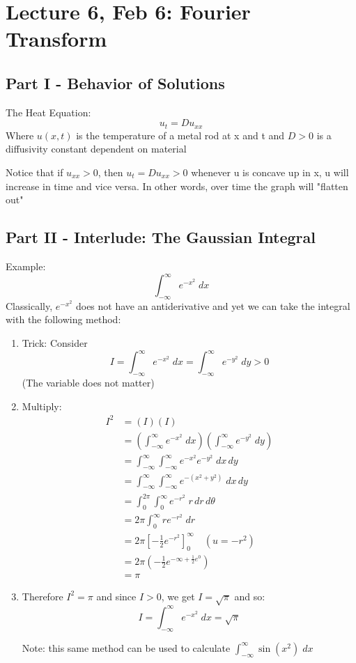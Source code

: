 \documentclass[12pt]{article}
\begin{document}
\section{Lecture 6, Feb 6: Fourier Transform}
\subsection*{Part I - Behavior of Solutions}
The Heat Equation:
\[u_t = Du_{xx}\]
Where $u(x, t)$ is the temperature of a metal rod at x and t and $D > 0$ is a diffusivity constant dependent on material

Notice that if $u_{xx} > 0$, then $u_t = Du_{xx} > 0$ whenever u is concave up in x, u will increase in time and vice versa. In other words, over time the graph will "flatten out"

\subsection*{Part II - Interlude: The Gaussian Integral}
Example: \[\int_{-\infty}^\infty e^{-x^2}\; dx\]
Classically, $e^{-x^2}$ does not have an antiderivative and yet we can take the integral with the following method:
\begin{enumerate}
    \item Trick: Consider 
    \[I = \int_{-\infty}^\infty e^{-x^2} \; dx = \int_{-\infty}^\infty e^{-y^2} \; dy > 0 \]
    (The variable does not matter)
    \item Multiply:
    \begin{align*}
        I^2 &= (I)(I)\\
        &= \left(\int_{-\infty}^\infty e^{-x^2} \; dx\right)\left(\int_{-\infty}^\infty e^{-y^2} \; dy\right)\\
        &= \int_{-\infty}^\infty \int_{-\infty}^\infty e^{-x^2} e^{-y^2} \; dx\, dy\\
        &= \int_{-\infty}^\infty \int_{-\infty}^\infty e^{-(x^2 +y^2)} \; dx\, dy\\
        &= \int_0^{2\pi} \int_0^\infty e^{-r^2} \; r\, dr\, d\theta\\
        &= 2\pi \int_0^\infty re^{-r^2} \; dr\\
        &= 2\pi \left[-\frac{1}{2}e^{-r^2}\right]_0^\infty \quad (u = -r^2)\\
        &= 2\pi \left(-\frac{1}{2}e^{-\infty + \frac{1}{2}e^0}\right)\\
        &= \pi        
    \end{align*}
    \item Therefore $I^2 = \pi$ and since $I > 0$, we get $I = \sqrt{\pi}$ and so:
    \[I = \int_{-\infty}^\infty e^{-x^2} \; dx =\sqrt{\pi}\]

    Note: this same method can be used to calculate $\int_{-\infty}^\infty \sin(x^2)\; dx$
\end{enumerate}
\end{document}
